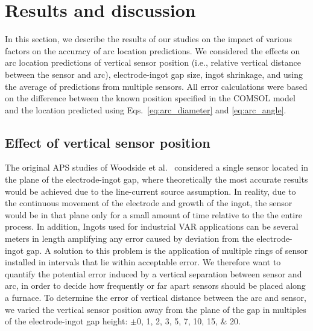 \documentclass[onehalf,11pt]{beavtex}
\begin{document}

\section{Results and discussion}
\label{s:results}

In this section, we describe the results of our studies on the impact of various factors on the accuracy of arc location predictions.
We considered the effects on arc location predictions of vertical sensor position (i.e., relative vertical distance between the sensor and arc), electrode-ingot gap size, ingot shrinkage, and using the average of predictions from multiple sensors.
All error calculations were based on the difference between the known position specified in the COMSOL model and the location predicted using Eqs.~\eqref{eq:arc_diameter} and \eqref{eq:arc_angle}.

\subsection{Effect of vertical sensor position}
\label{sec:vertical_position}

The original APS studies of Woodside et al.~\cite{Woodside:2010fi,Woodside:2013cf} considered a single sensor located in the plane of the electrode-ingot gap, where theoretically the most accurate results would be achieved due to the line-current source assumption.
In reality, due to the continuous movement of the electrode and growth of the ingot, the sensor would be in that plane only for a small amount of time relative to the the entire process.
In addition, Ingots used for industrial VAR applications can be several meters in length amplifying any error caused by deviation from the electrode-ingot gap. 
A solution to this problem is the application of multiple rings of sensor installed in intervals that lie within acceptable error.
We therefore want to quantify the potential error induced by a vertical separation between sensor and arc, in order to decide how frequently or far apart sensors should be placed along a furnace.
To determine the error of vertical distance between the arc and sensor, we varied the vertical sensor position away from the plane of the gap in multiples of the electrode-ingot gap height: $\pm$\numlist{0;1;2;3;5;7;10;15;20}.
\end{document}
